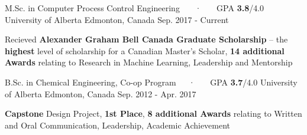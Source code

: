 

\begin{cventries}

  \cventry
    {M.Sc. in Computer Process Control Engineering ~~~·~~~ GPA \textbf{3.8}/4.0} %
    {University of Alberta} %
    {Edmonton, Canada} %
    {Sep. 2017 - Current} %
    {
      \begin{cvitems} %
        \item {Recieved \textbf{Alexander Graham Bell Canada Graduate Scholarship} – the \textbf{highest} level of scholarship for a Canadian Master's Scholar, \textbf{14 additional Awards} relating to Research in Machine Learning, Leadership and Mentorship }
      \end{cvitems}
    }

\cventry
{B.Sc. in Chemical Engineering, Co-op Program~~~·~~~ GPA \textbf{3.7}/4.0} %
{University of Alberta} %
{Edmonton, Canada} %
{Sep. 2012 - Apr. 2017} %
{
	\begin{cvitems} %
		\item {\textbf{Capstone} Design Project, \textbf{1st Place}, \textbf{8 additional Awards} relating to Written and Oral Communication, Leadership, Academic Achievement}
	\end{cvitems}
}

\end{cventries}
